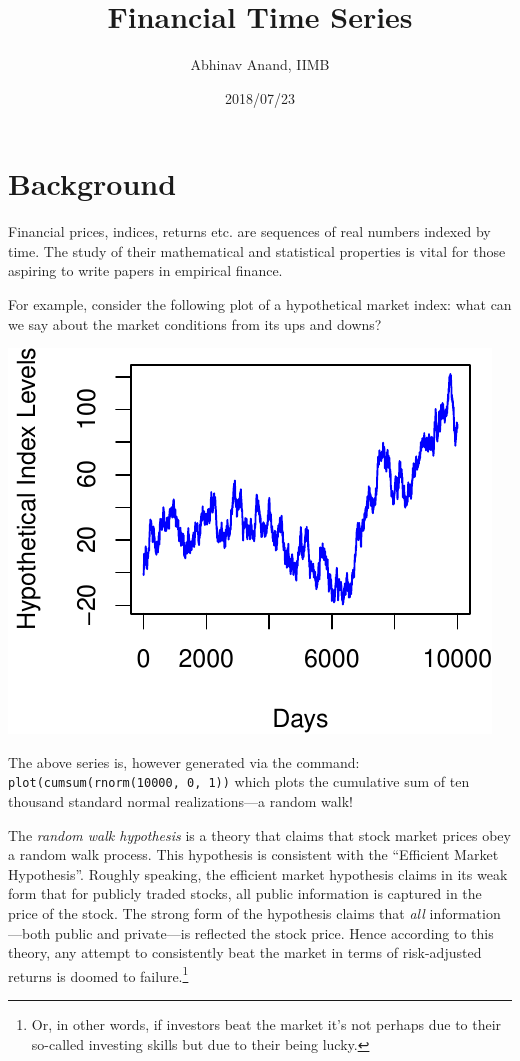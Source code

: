 \documentclass[11pt,]{article}
\title{Financial Time Series}
\author{Abhinav Anand, IIMB}
\date{2018/07/23}
\let\rmarkdownfootnote\footnote%
\def\footnote{\protect\rmarkdownfootnote}
\begin{document}
\maketitle

\section{Background}\label{background}

Financial prices, indices, returns etc. are sequences of real numbers
indexed by time. The study of their mathematical and statistical
properties is vital for those aspiring to write papers in empirical
finance.

For example, consider the following plot of a hypothetical market index:
what can we say about the market conditions from its ups and downs?

\begin{center}\includegraphics{FMC_T4_PhD_Fin_Time_Series_files/figure-latex/hypo_market_index-1} \end{center}

The above series is, however generated via the command:
\texttt{plot(cumsum(rnorm(10000,\ 0,\ 1))} which plots the cumulative
sum of ten thousand standard normal realizations---a random walk!

The \emph{random walk hypothesis} is a theory that claims that stock
market prices obey a random walk process. This hypothesis is consistent
with the ``Efficient Market Hypothesis''. Roughly speaking, the
efficient market hypothesis claims in its weak form that for publicly
traded stocks, all public information is captured in the price of the
stock. The strong form of the hypothesis claims that \emph{all}
information---both public and private---is reflected the stock price.
Hence according to this theory, any attempt to consistently beat the
market in terms of risk-adjusted returns is doomed to failure.\footnote{Or,
  in other words, if investors beat the market it's not perhaps due to
  their so-called investing skills but due to their being lucky.}
\end{document}
